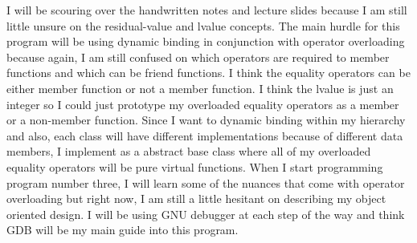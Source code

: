 \documentclass[11pt, a4paper]{article}
\begin{document}
\indent I will be scouring over the handwritten notes and lecture slides because I am still little unsure on the residual-value and lvalue concepts. The main hurdle for this program will be using dynamic binding in conjunction with operator overloading because again, I am still confused on which operators are required to member functions and which can be friend functions. I think the equality operators can be either member function or not a member function. I think the lvalue is just an integer so I could just prototype my overloaded equality operators as a member or a non-member function. Since I want to dynamic binding within my hierarchy and also, each class will have different implementations because of different data members, I implement as a abstract base class where all of my overloaded equality operators will be pure virtual functions. When I start programming program number three, I will learn some of the nuances that come with operator overloading but right now, I am still a little hesitant on describing my object oriented design. I will be using GNU debugger at each step of the way and think GDB will be my main guide into this program.
\end{document}
